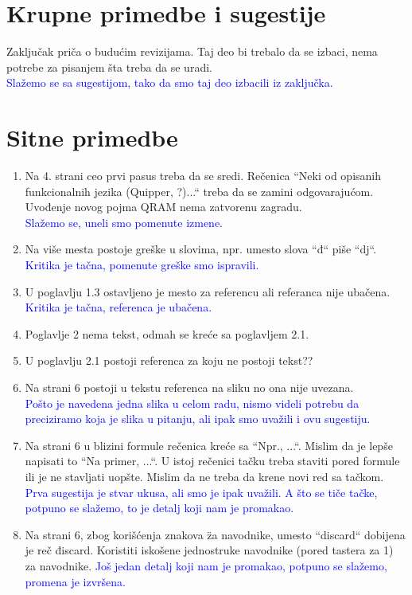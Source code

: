 \documentclass[a4paper]{report}
\newcommand{\odgovor}[1]{\textcolor{blue}{#1}}
\begin{document}
\section{Krupne primedbe i sugestije}
Zaključak priča o budućim revizijama. Taj deo bi trebalo da se izbaci, nema potrebe za pisanjem šta treba da se uradi. \\
\odgovor {Slažemo se sa sugestijom, tako da smo taj deo izbacili iz zaključka.}

\section{Sitne primedbe}
\begin{enumerate}
\item Na 4. strani ceo prvi pasus treba da se sredi.
Rečenica ``Neki od opisanih funkcionalnih jezika (Quipper, ?)...`` treba da se zamini odgovarajućom.
Uvođenje novog pojma QRAM nema zatvorenu zagradu.\\
\odgovor {Slažemo se, uneli smo pomenute izmene.}

\item Na više mesta postoje greške u slovima, npr. umesto slova ``đ`` piše ``dj``.
\odgovor {Kritika je tačna, pomenute greške smo ispravili.}
\item U poglavlju 1.3 ostavljeno je mesto za referencu ali referanca nije ubačena.
\odgovor {Kritika je tačna, referenca je ubačena.}
\item Poglavlje 2 nema tekst, odmah se kreće sa poglavljem 2.1.

\item U poglavlju 2.1 postoji referenca za koju ne postoji tekst??
\item Na strani 6 postoji u tekstu referenca na sliku no ona nije uvezana.\\
\odgovor {Pošto je navedena jedna slika u celom radu, nismo videli potrebu da preciziramo koja je slika u pitanju, ali ipak smo uvažili i ovu sugestiju.}
\item Na strani 6 u blizini formule rečenica kreće sa ``Npr., ...``. Mislim da je lepše napisati to ``Na primer, ...``. U istoj rečenici tačku treba staviti pored formule ili je ne stavljati uopšte. Mislim da ne treba da krene novi red sa tačkom.
\odgovor {Prva sugestija je stvar ukusa, ali smo je ipak uvažili. A što se tiče tačke, potpuno se slažemo, to je detalj koji nam je promakao.}
\item Na strani 6, zbog korišćenja znakova \" za navodnike, umesto ``discard`` dobijena je reč điscard. Koristiti iskošene jednostruke navodnike (pored tastera za 1) za navodnike.
\odgovor {Još jedan detalj koji nam je promakao, potpuno se slažemo, promena je izvršena.}
\end{enumerate}
\end{document}
